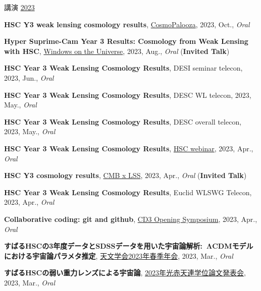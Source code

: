 \begin{rSection}{講演}
\underline{2023}
\begin{etaremune}
\setcounter{enumi}{35}
\item \textbf{HSC Y3 weak lensing cosmology results}, \href{https://cosmopalooza.lbl.gov/}{CosmoPalooza}, 2023, Oct., \textit{Oral}
\item \textbf{Hyper Suprime-Cam Year 3 Results: Cosmology from Weak Lensing with HSC}, \href{http://vietnam.in2p3.fr/2023/windows/index.html}{Windows on the Universe}, 2023, Aug., \textit{Oral} (\textbf{Invited Talk})
\item \textbf{HSC Year 3 Weak Lensing Cosmology Results}, DESI seminar telecon, 2023, Jun., \textit{Oral}
\item \textbf{HSC Year 3 Weak Lensing Cosmology Results}, DESC WL telecon, 2023, May., \textit{Oral}
\item \textbf{HSC Year 3 Weak Lensing Cosmology Results}, DESC overall telecon, 2023, May., \textit{Oral}
\item \textbf{HSC Year 3 Weak Lensing Cosmology Results}, \href{https://hsc-release.mtk.nao.ac.jp/doc/index.php/wly3/}{HSC webinar}, 2023, Apr., \textit{Oral}
\item \textbf{HSC Y3 cosmology results}, \href{https://www2.yukawa.kyoto-u.ac.jp/~cmb-lss/index.php}{CMB x LSS}, 2023, Apr., \textit{Oral} (\textbf{Invited Talk})
\item \textbf{HSC Year 3 Weak Lensing Cosmology Results}, Euclid WLSWG Telecon, 2023, Apr., \textit{Oral}
\item \textbf{Collaborative coding: git and github}, \href{https://cd3.ipmu.jp/opening/}{CD3 Opening Symposium}, 2023, Apr., \textit{Oral}
\item \textbf{すばるHSCの3年度データとSDSSデータを用いた宇宙論解析: ΛCDMモデルにおける宇宙論パラメタ推定}, \href{https://www.asj.or.jp/nenkai/archive/2023a/pdf/U20a.pdf}{天文学会2023年春季年会}, 2023, Mar., \textit{Oral}
\item \textbf{すばるHSCの弱い重力レンズによる宇宙論}, \href{http://gopira.jp/Dthesis2022/program.html}{2023年光赤天連学位論文発表会}, 2023, Mar., \textit{Oral}
\end{etaremune}


\end{rSection}
